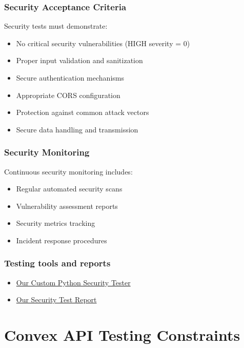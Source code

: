 \documentclass[a4paper,12pt]{article}
\begin{document}
\subsubsection{Security Acceptance Criteria}
Security tests must demonstrate:
\begin{itemize}
    \item No critical security vulnerabilities (HIGH severity = 0)
    \item Proper input validation and sanitization
    \item Secure authentication mechanisms
    \item Appropriate CORS configuration
    \item Protection against common attack vectors
    \item Secure data handling and transmission
\end{itemize}

\subsubsection{Security Monitoring}
Continuous security monitoring includes:
\begin{itemize}
    \item Regular automated security scans
    \item Vulnerability assessment reports
    \item Security metrics tracking
    \item Incident response procedures
\end{itemize}

\subsubsection{Testing tools and reports}
\begin{itemize}
 \item \href{https://github.com/COS301-SE-2025/TaxiTap/blob/00164c31e7b00acd4b7aab6527f9ad9b59471b28/testing/security/security_tester.py}{Our Custom Python Security Tester}
 \item \href{https://github.com/COS301-SE-2025/TaxiTap/blob/00164c31e7b00acd4b7aab6527f9ad9b59471b28/testing/security_test_report_20250924_133026.json}{Our Security Test Report}
\end{itemize}

\section{Convex API Testing Constraints}
\end{document}
